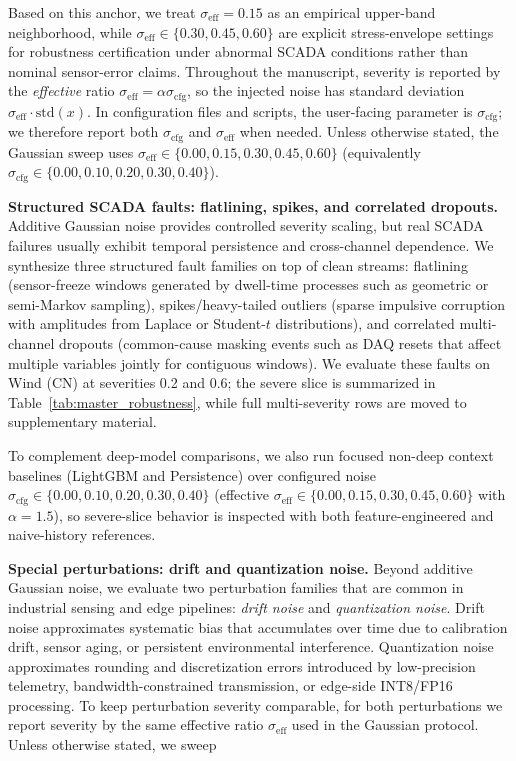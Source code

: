 \documentclass[review,1p,times]{elsarticle}
\begin{document}
Based on this anchor, we treat $\sigma_{\mathrm{eff}}=0.15$ as an empirical upper-band neighborhood, while $\sigma_{\mathrm{eff}}\in\{0.30,0.45,0.60\}$ are explicit stress-envelope settings for robustness certification under abnormal SCADA conditions rather than nominal sensor-error claims. Throughout the manuscript, severity is reported by the \emph{effective} ratio $\sigma_{\mathrm{eff}}=\alpha\sigma_{\mathrm{cfg}}$, so the injected noise has standard deviation $\sigma_{\mathrm{eff}}\cdot\mathrm{std}(x)$. In configuration files and scripts, the user-facing parameter is $\sigma_{\mathrm{cfg}}$; we therefore report both $\sigma_{\mathrm{cfg}}$ and $\sigma_{\mathrm{eff}}$ when needed. Unless otherwise stated, the Gaussian sweep uses $\sigma_{\mathrm{eff}}\in\{0.00,0.15,0.30,0.45,0.60\}$ (equivalently $\sigma_{\mathrm{cfg}}\in\{0.00,0.10,0.20,0.30,0.40\}$).

\noindent\textbf{Structured SCADA faults: flatlining, spikes, and correlated dropouts.}
\label{subsubsec:robust_structured}
Additive Gaussian noise provides controlled severity scaling, but real SCADA failures usually exhibit temporal persistence and cross-channel dependence. We synthesize three structured fault families on top of clean streams: flatlining (sensor-freeze windows generated by dwell-time processes such as geometric or semi-Markov sampling), spikes/heavy-tailed outliers (sparse impulsive corruption with amplitudes from Laplace or Student-$t$ distributions), and correlated multi-channel dropouts (common-cause masking events such as DAQ resets that affect multiple variables jointly for contiguous windows). We evaluate these faults on Wind (CN) at severities 0.2 and 0.6; the severe slice is summarized in Table~\ref{tab:master_robustness}, while full multi-severity rows are moved to supplementary material.

To complement deep-model comparisons, we also run focused non-deep context baselines (LightGBM and Persistence) over configured noise $\sigma_{\mathrm{cfg}}\in\{0.00,0.10,0.20,0.30,0.40\}$ (effective $\sigma_{\mathrm{eff}}\in\{0.00,0.15,0.30,0.45,0.60\}$ with $\alpha=1.5$), so severe-slice behavior is inspected with both feature-engineered and naive-history references.

\noindent\textbf{Special perturbations: drift and quantization noise.}
Beyond additive Gaussian noise, we evaluate two perturbation families that are common in industrial sensing and edge pipelines: \emph{drift noise} and \emph{quantization noise}. Drift noise approximates systematic bias that accumulates over time due to calibration drift, sensor aging, or persistent environmental interference. Quantization noise approximates rounding and discretization errors introduced by low-precision telemetry, bandwidth-constrained transmission, or edge-side INT8/FP16 processing. To keep perturbation severity comparable, for both perturbations we report severity by the same effective ratio $\sigma_{\mathrm{eff}}$ used in the Gaussian protocol. Unless otherwise stated, we sweep
\end{document}

